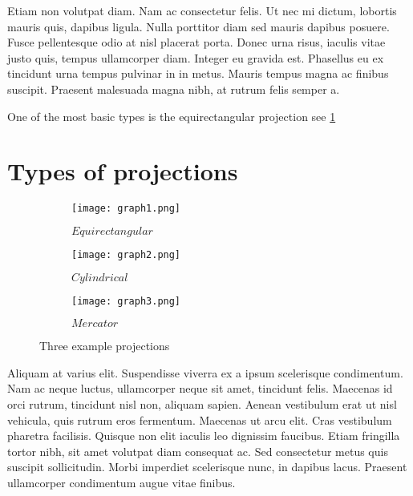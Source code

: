 Etiam non volutpat diam. Nam ac consectetur felis. Ut nec mi dictum, lobortis mauris quis, dapibus ligula. Nulla porttitor diam sed mauris dapibus posuere. Fusce pellentesque odio at nisl placerat porta. Donec urna risus, iaculis vitae justo quis, tempus ullamcorper diam. Integer eu gravida est. Phasellus eu ex tincidunt urna tempus pulvinar in in metus. Mauris tempus magna ac finibus suscipit. Praesent malesuada magna nibh, at rutrum felis semper a.


One of the most basic types is the equirectangular projection see \ref{fig:equirectangular}


\section{Types of projections}



\begin{figure}[h]
	\centering
	\begin{subfigure}[b]{0.3\textwidth}
		\centering
		\texttt{[image: graph1.png]}
		\caption{$Equirectangular$}
		\label{fig:equirectangular}
	\end{subfigure}
	\hfill
	\begin{subfigure}[b]{0.3\textwidth}
		\centering
		\texttt{[image: graph2.png]}
		\caption{$Cylindrical$}
		\label{fig:cylindrical}
	\end{subfigure}
	\hfill
	\begin{subfigure}[b]{0.3\textwidth}
		\centering
		\texttt{[image: graph3.png]}
		\caption{$Mercator$}
		\label{fig:mercator}
	\end{subfigure}
	\caption{Three example projections}
	\label{fig:three_projections}
\end{figure}

Aliquam at varius elit. Suspendisse viverra ex a ipsum scelerisque condimentum. Nam ac neque luctus, ullamcorper neque sit amet, tincidunt felis. Maecenas id orci rutrum, tincidunt nisl non, aliquam sapien. Aenean vestibulum erat ut nisl vehicula, quis rutrum eros fermentum. Maecenas ut arcu elit. Cras vestibulum pharetra facilisis. Quisque non elit iaculis leo dignissim faucibus. Etiam fringilla tortor nibh, sit amet volutpat diam consequat ac. Sed consectetur metus quis suscipit sollicitudin. Morbi imperdiet scelerisque nunc, in dapibus lacus. Praesent ullamcorper condimentum augue vitae finibus. 